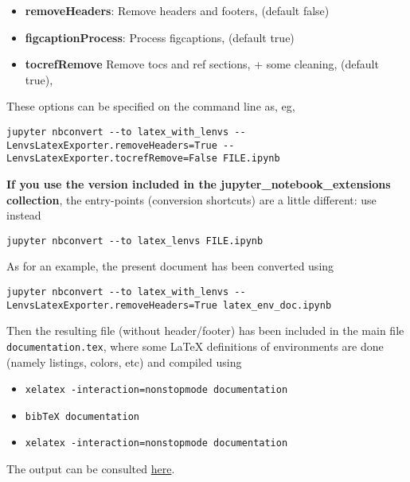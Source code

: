 \begin{itemize}
\tightlist
\item
  \textbf{removeHeaders}: Remove headers and footers, (default false)
\item
  \textbf{figcaptionProcess}: Process figcaptions, (default true)
\item
  \textbf{tocrefRemove} Remove tocs and ref sections, + some cleaning,
  (default true),
\end{itemize}

These options can be specified on the command line as, eg,

\begin{verbatim}
jupyter nbconvert --to latex_with_lenvs --LenvsLatexExporter.removeHeaders=True -- LenvsLatexExporter.tocrefRemove=False FILE.ipynb
\end{verbatim}

\textbf{If you use the version included in the
jupyter\_notebook\_extensions collection}, the entry-points (conversion
shortcuts) are a little different: use instead

\begin{verbatim}
jupyter nbconvert --to latex_lenvs FILE.ipynb
\end{verbatim}

    \begin{example} As for an example, the present document has
been converted using

\begin{verbatim}
jupyter nbconvert --to latex_with_lenvs --LenvsLatexExporter.removeHeaders=True latex_env_doc.ipynb
\end{verbatim}

Then the resulting file (without header/footer) has been included in the
main file \texttt{documentation.tex}, where some LaTeX definitions of
environments are done (namely listings, colors, etc) and compiled using

\begin{itemize}
\tightlist
\item
  \texttt{xelatex\ -interaction=nonstopmode\ documentation}
\item
  \texttt{bibTeX\ documentation}
\item
  \texttt{xelatex\ -interaction=nonstopmode\ documentation}
\end{itemize}

The output can be consulted \href{documentation.pdf}{here}.\\
\end{example}

